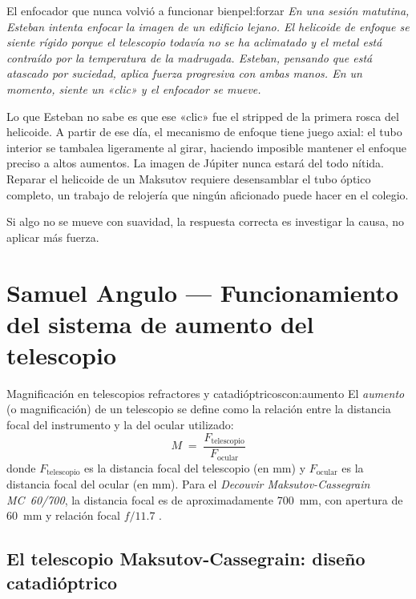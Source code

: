 \documentclass[12pt,oneside]{book}
\begin{document}
\begin{peligro}{El enfocador que nunca volvió a funcionar bien}{pel:forzar}
    \itshape
    En una sesión matutina, Esteban intenta enfocar la imagen de un edificio lejano.
    El helicoide de enfoque se siente rígido porque el telescopio todavía no se
    ha aclimatado y el metal está contraído por la temperatura de la madrugada.
    Esteban, pensando que está atascado por suciedad, aplica fuerza progresiva
    con ambas manos. En un momento, siente un «clic» y el enfocador se mueve.

    Lo que Esteban no sabe es que ese «clic» fue el stripped de la primera rosca
    del helicoide. A partir de ese día, el mecanismo de enfoque tiene juego axial:
    el tubo interior se tambalea ligeramente al girar, haciendo imposible mantener
    el enfoque preciso a altos aumentos. La imagen de Júpiter nunca estará del todo
    nítida. Reparar el helicoide de un Maksutov requiere desensamblar el tubo
    óptico completo, un trabajo de relojería que ningún aficionado puede hacer en
    el colegio.

    \medskip
    \normalfont
    Si algo no se mueve con suavidad, la respuesta correcta es investigar la causa,
    no aplicar más fuerza. \cite{tonkin2007,suiter1994}
\end{peligro}

\section{Samuel Angulo — Funcionamiento del sistema de aumento del telescopio}

\begin{concepto}{Magnificación en telescopios refractores y catadióptricos}{con:aumento}
    El \emph{aumento} (o magnificación) de un telescopio se define como la relación
    entre la distancia focal del instrumento y la del ocular utilizado:
    \[
        M \;=\; \frac{F_{\text{telescopio}}}{F_{\text{ocular}}}
    \]
    donde $F_{\text{telescopio}}$ es la distancia focal del telescopio (en mm) y
    $F_{\text{ocular}}$ es la distancia focal del ocular (en mm). Para el
    \emph{Decouvir Maksutov-Cassegrain MC~60/700}, la distancia focal es de
    aproximadamente 700~mm, con apertura de 60~mm y relación focal $f/11.7$
    \cite{decouvir2020}.
\end{concepto}

\subsection{El telescopio Maksutov-Cassegrain: diseño catadióptrico}
\end{document}
